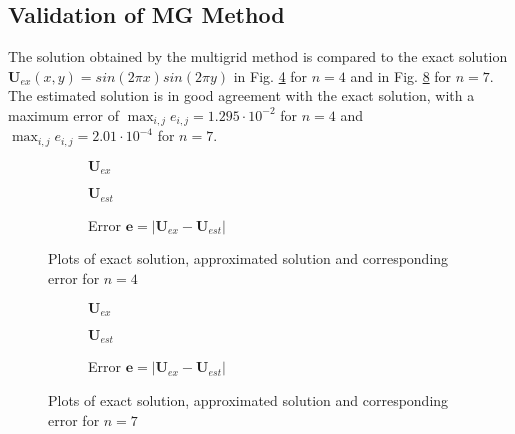 \documentclass[11pt,a4paper]{article}
\newcommand{\refFig}[1]{Fig. \ref{#1}}
\begin{document}
\subsection{Validation of MG Method}
The solution obtained by the multigrid method is compared to the exact solution $\mathbf{U}_{ex}(x,y) = sin(2\pi x)sin(2 \pi y)$ in \refFig{fig::Val4} for $n=4$ and in \refFig{fig::Val7} for $n=7$. The estimated solution is in good agreement with the exact solution, with a maximum error of $\max_{i,j} e_{i,j} = 1.295 \cdot 10^{-2}$ for $n=4$ and $\max_{i,j} e_{i,j} = 2.01 \cdot 10^{-4}$ for $n=7$. 
%
\begin{figure}[h!]
	\centering
	\begin{subfigure}[h!]{.3\textwidth}
			\centering
			\resizebox{0.4\width}{!}{}
			\caption{$\mathbf{U}_{ex}$}
			\label{fig::Uex4}
	\end{subfigure}
	\hfill
	\begin{subfigure}[h!]{.3\textwidth}
		\centering
		\resizebox{0.4\width}{!}{}
		\caption{$\mathbf{U}_{est}$}
		\label{fig::Uest4}
	\end{subfigure}
	\hfill
	\begin{subfigure}[h!]{.3\textwidth}
		\centering
		\resizebox{0.4\width}{!}{}
		\caption{Error $\mathbf{e} = |\mathbf{U}_{ex} - \mathbf{U}_{est}|$}
		\label{fig::Error4}
	\end{subfigure}
	\caption{Plots of exact solution, approximated solution and corresponding error for $n=4$ }
	\label{fig::Val4}
\end{figure}
%
\begin{figure}[h!]
	\centering
	\begin{subfigure}[h!]{.3\textwidth}
		\centering
		\resizebox{0.4\width}{!}{}
		\caption{$\mathbf{U}_{ex}$}
		\label{fig::Uex7}
	\end{subfigure}
	\hfill
	\begin{subfigure}[h!]{.3\textwidth}
		\centering
		\resizebox{0.4\width}{!}{}
		\caption{$\mathbf{U}_{est}$}
		\label{fig::Uest7}
	\end{subfigure}
	\hfill
	\begin{subfigure}[h!]{.3\textwidth}
		\centering
		\resizebox{0.4\width}{!}{}
		\caption{Error $\mathbf{e} = |\mathbf{U}_{ex} - \mathbf{U}_{est}|$}
		\label{fig::Error7}
	\end{subfigure}
	\caption{Plots of exact solution, approximated solution and corresponding error for $n=7$ }
	\label{fig::Val7}
\end{figure}
%
\newpage
\end{document}
